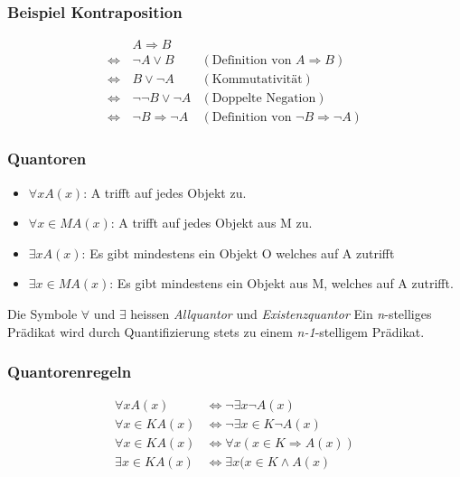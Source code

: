 \subsubsection{Beispiel Kontraposition}
\begin{minipage}{0.9\linewidth}
\begin{align*}
                     &A\Rightarrow B\\
   \Leftrightarrow\, &\neg A\lor B                  &(\text{Definition von }A\Rightarrow B)\\
   \Leftrightarrow\, &B\lor \neg A                  &(\text{Kommutativität})\\
   \Leftrightarrow\, &\neg\neg B\lor\neg A          &(\text{Doppelte Negation})\\
   \Leftrightarrow\, &\neg B\Rightarrow \neg A      &(\text{Definition von }\neg B\Rightarrow\neg A)
\end{align*}
\end{minipage}

\subsubsection{Quantoren}
\begin{minipage}{0.9\linewidth}
\begin{itemize}
 \item $\forall xA (x)$: A trifft auf jedes Objekt zu.
 \item $\forall x \in M A(x)$: A trifft auf jedes Objekt aus M zu.
 \item $\exists x A(x)$: Es gibt mindestens ein Objekt O welches auf A zutrifft
 \item $\exists x \in M A(x)$: Es gibt mindestens ein Objekt aus M, welches auf A zutrifft.
\end{itemize}
Die Symbole $\forall$ und $\exists$ heissen \textit{Allquantor} und \textit{Existenzquantor}
Ein \textit{n}-stelliges Prädikat wird durch Quantifizierung stets zu einem \textit{n-1}-stelligem Prädikat.
\end{minipage}

\subsubsection{Quantorenregeln}
\begin{minipage}{0.9\linewidth}
\begin{align*}
 \forall x A(x) &\Leftrightarrow \neg\exists x \neg A(x) \\
 \forall x \in K A(x) &\Leftrightarrow \neg\exists x \in K \neg A(x) \\
 \forall x \in K A(x) &\Leftrightarrow \forall x(x\in K \Rightarrow A(x)) \\
 \exists x \in K A(x) &\Leftrightarrow \exists x (x \in K \land A(x) \\
\end{align*}
\end{minipage}

